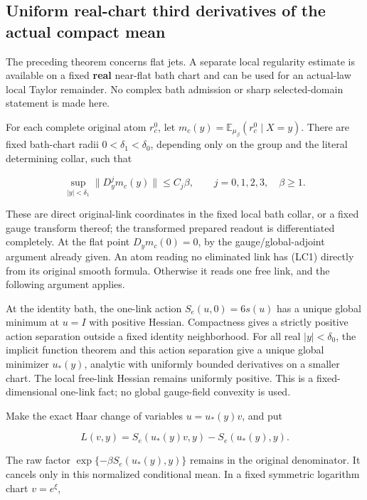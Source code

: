 \documentclass[
  11pt,
]{article}
\begin{document}
\hypertarget{uniform-real-chart-third-derivatives-of-the-actual-compact-mean}{%
\subsection{Uniform real-chart third derivatives of the actual compact
mean}\label{uniform-real-chart-third-derivatives-of-the-actual-compact-mean}}

The preceding theorem concerns flat jets. A separate local regularity
estimate is available on a fixed \textbf{real} near-flat bath chart and
can be used for an actual-law local Taylor remainder. No complex bath
admission or sharp selected-domain statement is made here.

For each complete original atom \(r_c^0\), let
\(m_c(y)=\mathbb E_{\mu_\beta}(r_c^0\mid X=y)\). There are fixed
bath-chart radii \(0<\delta_1<\delta_0\), depending only on the group
and the literal determining collar, such that

\[
 \sup_{|y|<\delta_1}\|D_y^j m_c(y)\|\le C_j\beta,
 \qquad j=0,1,2,3,\quad\beta\ge1.                \tag{LC1}
\]

These are direct original-link coordinates in the fixed local bath
collar, or a fixed gauge transform thereof; the transformed prepared
readout is differentiated completely. At the flat point
\(D_y m_c(0)=0\), by the gauge/global-adjoint argument already given. An
atom reading no eliminated link has (LC1) directly from its original
smooth formula. Otherwise it reads one free link, and the following
argument applies.

At the identity bath, the one-link action \(S_e(u,0)=6s(u)\) has a
unique global minimum at \(u=I\) with positive Hessian. Compactness
gives a strictly positive action separation outside a fixed identity
neighborhood. For all real \(|y|<\delta_0\), the implicit function
theorem and this action separation give a unique global minimizer
\(u_*(y)\), analytic with uniformly bounded derivatives on a smaller
chart. The local free-link Hessian remains uniformly positive. This is a
fixed-dimensional one-link fact; no global gauge-field convexity is
used.

Make the exact Haar change of variables \(u=u_*(y)v\), and put

\[
 L(v,y)=S_e(u_*(y)v,y)-S_e(u_*(y),y).
\]

The raw factor \(\exp\{-\beta S_e(u_*(y),y)\}\) remains in the original
denominator. It cancels only in this normalized conditional mean. In a
fixed symmetric logarithm chart \(v=e^\xi\),
\end{document}

